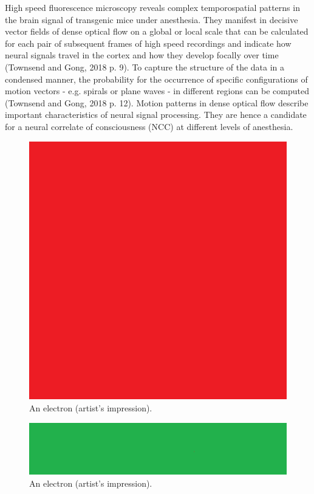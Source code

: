 High speed fluorescence microscopy reveals complex temporospatial patterns in the brain signal of transgenic mice under anesthesia. They manifest in decisive vector fields of dense optical flow on a global or local scale that can be calculated for each pair of subsequent frames of high speed recordings and indicate how neural signals travel in the cortex and how they develop focally over time (Townsend and Gong, 2018 p. 9). To capture the structure of the data in a condensed manner, the probability for the occurrence of specific configurations of motion vectors  - e.g. spirals or plane waves - in different regions can be computed (Townsend and Gong, 2018 p. 12). Motion patterns in dense optical flow describe important characteristics of neural signal processing. They are hence a candidate for a neural correlate of consciousness (NCC) at different levels of anesthesia.

\begin{figure}[th]
\centering
\includegraphics{Figures/test1}
\decoRule
\caption[An Electron]{An electron (artist's impression).}
\label{fig:test1}
\end{figure}

\begin{figure}[th]
\centering
\includegraphics{Figures/test2}
\decoRule
\caption[An Electron]{An electron (artist's impression).}
\label{fig:test2}
\end{figure}

